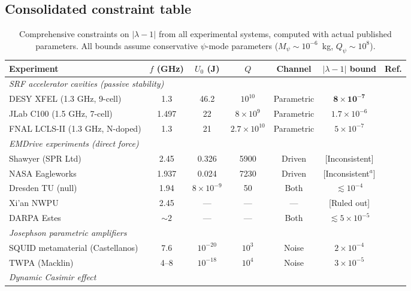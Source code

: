 \documentclass[12pt,aps,prd,twocolumn,superscriptaddress,nofootinbib]{revtex4-2}
\newcommand{\Mpsi}{M_\psi}
\begin{document}
\subsection{Consolidated constraint table}

\begin{table}
\caption{Comprehensive constraints on $|\lambda-1|$ from all
experimental systems, computed with actual published parameters.
All bounds assume conservative $\psi$-mode parameters
($\Mpsi \sim 10^{-6}$~kg, $Q_\psi \sim 10^8$).}
\label{tab:all_constraints}
\begin{ruledtabular}
\begin{tabular}{lcccccc}
\textbf{Experiment} & \textbf{$f$ (GHz)} & \textbf{$U_0$ (J)} &
\textbf{$Q$} & \textbf{Channel} & \textbf{$|\lambda-1|$ bound} &
\textbf{Ref.} \\
\hline
\multicolumn{7}{l}{\textit{SRF accelerator cavities (passive stability)}} \\
DESY XFEL (1.3 GHz, 9-cell) & 1.3 & 46.2 & $10^{10}$ &
Parametric & $\mathbf{8\times10^{-7}}$ & \cite{Aune2000} \\
JLab C100 (1.5 GHz, 7-cell) & 1.497 & 22 & $8\times10^{9}$ &
Parametric & $1.7\times10^{-6}$ & \\
FNAL LCLS-II (1.3 GHz, N-doped) & 1.3 & 21 & $2.7\times10^{10}$ &
Parametric & $5\times10^{-7}$ & \cite{Grassellino2013} \\
\hline
\multicolumn{7}{l}{\textit{EMDrive experiments (direct force)}} \\
Shawyer (SPR Ltd) & 2.45 & 0.326 & 5900 &
Driven & [Inconsistent] & \\
NASA Eagleworks & 1.937 & 0.024 & 7230 &
Driven & [Inconsistent$^a$] & \cite{White2017} \\
Dresden TU (null) & 1.94 & $8\times10^{-9}$ & 50 &
Both & $\lesssim10^{-4}$ & \cite{Tajmar2021} \\
Xi'an NWPU & 2.45 & --- & --- &
--- & [Ruled out] & \\
DARPA Estes & $\sim2$ & --- & --- &
Both & $\lesssim5\times10^{-5}$ & \\
\hline
\multicolumn{7}{l}{\textit{Josephson parametric amplifiers}} \\
SQUID metamaterial (Castellanos) & 7.6 & $10^{-20}$ & $10^3$ &
Noise & $2\times10^{-4}$ & \cite{CastellanosBeltran2008} \\
TWPA (Macklin) & 4--8 & $10^{-18}$ & $10^4$ &
Noise & $3\times10^{-5}$ & \cite{Macklin2015} \\
\hline
\multicolumn{7}{l}{\textit{Dynamic Casimir effect}} \\

\end{tabular}
\end{ruledtabular}
\end{table}
\end{document}
